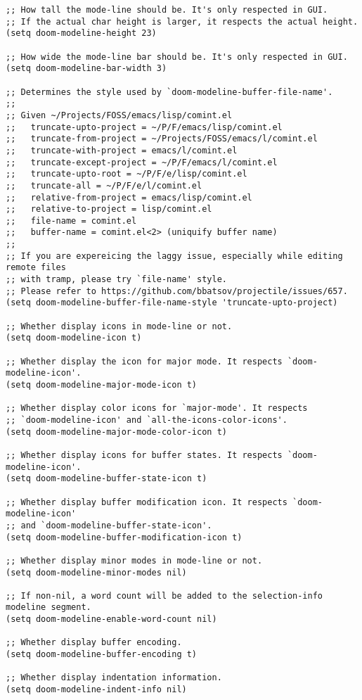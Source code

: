 \documentclass[11pt]{article}
\begin{document}
\begin{verbatim}
;; How tall the mode-line should be. It's only respected in GUI.
;; If the actual char height is larger, it respects the actual height.
(setq doom-modeline-height 23)

;; How wide the mode-line bar should be. It's only respected in GUI.
(setq doom-modeline-bar-width 3)

;; Determines the style used by `doom-modeline-buffer-file-name'.
;;
;; Given ~/Projects/FOSS/emacs/lisp/comint.el
;;   truncate-upto-project = ~/P/F/emacs/lisp/comint.el
;;   truncate-from-project = ~/Projects/FOSS/emacs/l/comint.el
;;   truncate-with-project = emacs/l/comint.el
;;   truncate-except-project = ~/P/F/emacs/l/comint.el
;;   truncate-upto-root = ~/P/F/e/lisp/comint.el
;;   truncate-all = ~/P/F/e/l/comint.el
;;   relative-from-project = emacs/lisp/comint.el
;;   relative-to-project = lisp/comint.el
;;   file-name = comint.el
;;   buffer-name = comint.el<2> (uniquify buffer name)
;;
;; If you are expereicing the laggy issue, especially while editing remote files
;; with tramp, please try `file-name' style.
;; Please refer to https://github.com/bbatsov/projectile/issues/657.
(setq doom-modeline-buffer-file-name-style 'truncate-upto-project)

;; Whether display icons in mode-line or not.
(setq doom-modeline-icon t)

;; Whether display the icon for major mode. It respects `doom-modeline-icon'.
(setq doom-modeline-major-mode-icon t)

;; Whether display color icons for `major-mode'. It respects
;; `doom-modeline-icon' and `all-the-icons-color-icons'.
(setq doom-modeline-major-mode-color-icon t)

;; Whether display icons for buffer states. It respects `doom-modeline-icon'.
(setq doom-modeline-buffer-state-icon t)

;; Whether display buffer modification icon. It respects `doom-modeline-icon'
;; and `doom-modeline-buffer-state-icon'.
(setq doom-modeline-buffer-modification-icon t)

;; Whether display minor modes in mode-line or not.
(setq doom-modeline-minor-modes nil)

;; If non-nil, a word count will be added to the selection-info modeline segment.
(setq doom-modeline-enable-word-count nil)

;; Whether display buffer encoding.
(setq doom-modeline-buffer-encoding t)

;; Whether display indentation information.
(setq doom-modeline-indent-info nil)


\end{verbatim}
\end{document}
